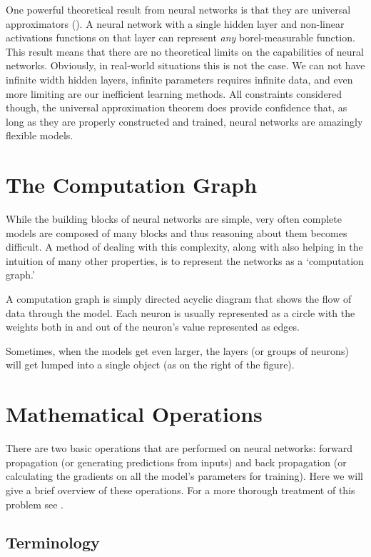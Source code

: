 \documentclass[]{book}
\theoremstyle{definition}
\theoremstyle{definition}
\theoremstyle{definition}
\theoremstyle{remark}
\begin{document}
One powerful theoretical result from neural networks is that they are
universal approximators (\citet{universal_approximators}). A neural
network with a single hidden layer and non-linear activations functions
on that layer can represent \emph{any} borel-measurable function. This
result means that there are no theoretical limits on the capabilities of
neural networks. Obviously, in real-world situations this is not the
case. We can not have infinite width hidden layers, infinite parameters
requires infinite data, and even more limiting are our inefficient
learning methods. All constraints considered though, the universal
approximation theorem does provide confidence that, as long as they are
properly constructed and trained, neural networks are amazingly flexible
models.

\section{The Computation Graph}\label{the-computation-graph}

While the building blocks of neural networks are simple, very often
complete models are composed of many blocks and thus reasoning about
them becomes difficult. A method of dealing with this complexity, along
with also helping in the intuition of many other properties, is to
represent the networks as a `computation graph.'

A computation graph is simply directed acyclic diagram that shows the
flow of data through the model. Each neuron is usually represented as a
circle with the weights both in and out of the neuron's value
represented as edges.

Sometimes, when the models get even larger, the layers (or groups of
neurons) will get lumped into a single object (as on the right of the
figure).

\section{Mathematical Operations}\label{mathematical-operations}

There are two basic operations that are performed on neural networks:
forward propagation (or generating predictions from inputs) and back
propagation (or calculating the gradients on all the model's parameters
for training). Here we will give a brief overview of these operations.
For a more thorough treatment of this problem see \citet{goodfellow_DL}.

\subsection{Terminology}\label{terminology}
\end{document}

